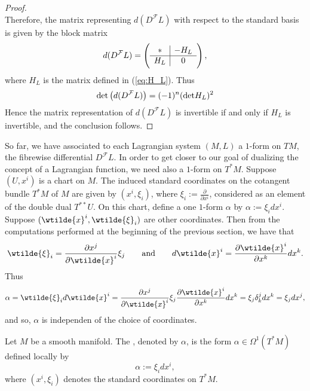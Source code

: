 \begin{proof}
\begin{equation*}
	\end{equation*}
	Therefore, the matrix representing $d(D^\mathcal{F}L)$ with respect to the standard basis is given by the block matrix
	\begin{equation*}
		d(D^\mathcal{F}L) = \del{\begin{array}{c|c}
			* & -H_L\\\hline
			H_L & 0
		\end{array}},
	\end{equation*}
	\noindent where $H_L$ is the matrix defined in (\ref{eq:H_L}). Thus 
	\begin{equation*}
		\det\del[1]{d(D^\mathcal{F}L)} = (-1)^n(\det H_L)^2
	\end{equation*}
	Hence the matrix representation of $d(D^\mathcal{F}L)$ is invertible if and only if $H_L$ is invertible, and the conclusion follows.
\end{proof}

So far, we have associated to each Lagrangian system $(M,L)$ a $1$-form on $TM$, the fibrewise differential $D^\mathcal{F}L$. In order to get closer to our goal of dualizing the concept of a Lagrangian function, we need also a $1$-form on $T^*M$. Suppose $(U,x^i)$ is a chart on $M$. The induced standard coordinates on the cotangent bundle $T^*M$ of $M$ are given by $(x^i,\xi_i)$, where $\xi_i := \frac{\partial}{\partial x^i}$, considered as an element of the double dual $T^{**}U$. On this chart, define a one $1$-form $\alpha$ by $\alpha := \xi_i dx^i$. Suppose $(\wtilde{x}^i,\wtilde{\xi}_i)$ are other coordinates. Then from the computations performed at the beginning of the previous section, we have that
\begin{equation*}
	\wtilde{\xi}_i = \frac{\partial x^j}{\partial \wtilde{x}^i}\xi_j \qquad \text{and} \qquad d\wtilde{x}^i = \frac{\partial \wtilde{x}^i}{\partial x^k}dx^k.
\end{equation*}
Thus
\begin{equation*}
	\alpha = \wtilde{\xi}_i d\wtilde{x}^i = \frac{\partial x^j}{\partial \wtilde{x}^i}\xi_j\frac{\partial \wtilde{x}^i}{\partial x^k}dx^k = \xi_j \delta^j_k dx^k = \xi_j dx^j,
\end{equation*}
\noindent and so, $\alpha$ is independen of the choice of coordinates.

\begin{definition}
	\label{def:tautological_form}
	Let $M$ be a smooth manifold. The , denoted by $\alpha$, is the form  $\alpha \in \Omega^1(T^*M)$ defined locally by
	\begin{equation*}
		\alpha := \xi_idx^i,
	\end{equation*}
	\noindent where $(x^i,\xi_i)$ denotes the standard coordinates on $T^*M$.
\end{definition}

